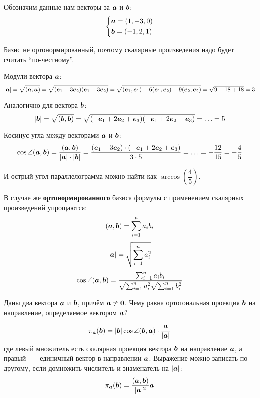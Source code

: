 \documentclass[a4paper,12pt]{article}
\begin{document}
  \begin{solution}
    Обозначим данные нам векторы за $\boldsymbol a$ и $\boldsymbol b$:
    \[
      \left\{
        \begin{aligned}
          &\boldsymbol a = (1, -3, 0)\\
          &\boldsymbol b = (-1, 2, 1)
        \end{aligned}
      \right.
    \]
    
    Базис не ортонормированный, поэтому скалярные произведения надо будет считать ``по-честному''.
    
    Модули вектора $\boldsymbol a$:
    \[
      |\boldsymbol a| = \sqrt{(\boldsymbol a, \boldsymbol a)} = \sqrt{(\boldsymbol e_1 - 3\boldsymbol e_2)(\boldsymbol e_1 - 3\boldsymbol e_2)}
        = \sqrt{(\boldsymbol e_1, \boldsymbol e_1) - 6(\boldsymbol e_1, \boldsymbol e_2) + 9(\boldsymbol e_2, \boldsymbol e_2)}
        = \sqrt{9 - 18 + 18} = 3
    \]
    
    Аналогично для вектора $\boldsymbol b$:
    \[
      |\boldsymbol b| = \sqrt{(\boldsymbol b, \boldsymbol b)} = \sqrt{(-\boldsymbol e_1 + 2\boldsymbol e_2 + \boldsymbol e_3)(-\boldsymbol e_1 + 2\boldsymbol e_2 + \boldsymbol e_3)}
        = \ldots = 5
    \]
    
    Косинус угла между векторами $\boldsymbol a$ и $\boldsymbol b$:
    \[
      \cos\angle(\boldsymbol a, \boldsymbol b) = \frac{(\boldsymbol a, \boldsymbol b)}{|\boldsymbol a| \cdot |\boldsymbol b|}
        = \frac{(\boldsymbol e_1 - 3\boldsymbol e_2) \cdot (-\boldsymbol e_1 + 2\boldsymbol e_2 + \boldsymbol e_3)}{3 \cdot 5}
        = \ldots = -\frac{12}{15} = -\frac{4}{5}
    \]
    
    И острый угол параллелограмма можно найти как $\arccos{\left(\dfrac{4}{5}\right)}$.
  \end{solution}
  
  В случае же \textbf{ортонормированного} базиса формулы с применением скалярных произведений упрощаются:
  \[
    (\boldsymbol a, \boldsymbol b) = \sum_{i=1}^n a_i b_i
  \]
  \[
    |\boldsymbol a| = \sqrt{\sum_{i=1}^n a_i^2}
  \]
  \[
    \cos\angle(\boldsymbol a, \boldsymbol b) = \frac{\sum_{i=1}^n a_i b_i}{\sqrt{\sum_{i=1}^n a_i^2} \sqrt{\sum_{i=1}^n b_i^2}}
  \]
  
  
  \begin{problem}[2.24]
    Даны два вектора $\boldsymbol a$ и $\boldsymbol b$, причём $\bds a \hm{\not=} \bds 0$.
    Чему равна ортогональная проекция $\boldsymbol b$ на направление, определяемое вектором $\boldsymbol a$?
  \end{problem}
  
  \begin{solution}
    \[
      \pi_{\boldsymbol a}(\boldsymbol b) = |\boldsymbol b| \cos\angle(\boldsymbol b, \boldsymbol a) \cdot \frac{\boldsymbol a}{|\boldsymbol a|}
    \]
    где левый множитель есть скалярная проекция вектора $\boldsymbol b$ на направление $\boldsymbol a$,
    а правый~---~единичный вектор в направлении $\boldsymbol a$.
    Выражение можно записать по-другому, если домножить числитель и знаменатель на $|\boldsymbol a|$:
    \[
      \pi_{\boldsymbol a}(\boldsymbol b) = \frac{(\boldsymbol a, \boldsymbol b)}{|\boldsymbol a|^2} \boldsymbol a
    \]
  \end{solution}
\end{document}
